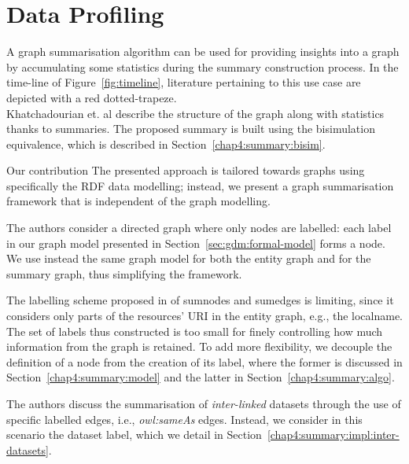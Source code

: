 
\section{Data Profiling}
\label{chap3:review:query-profiling}

A graph summarisation algorithm can be used for providing insights into a graph by accumulating some statistics during the summary construction process. In the time-line of Figure~\ref{fig:timeline}, literature pertaining to this use case are depicted with a red dotted-trapeze.\\

Khatchadourian et. al \cite{khatchadourian:2010:eswc} describe the structure of the graph along with statistics thanks to summaries. The proposed summary is built using the bisimulation equivalence, which is described in Section~\ref{chap4:summary:bisim}.

\begin{centeremph}{Our contribution}
	The presented approach is tailored towards graphs using specifically the RDF data modelling; instead, we present a graph summarisation framework that is independent of the graph modelling.

	The authors consider a directed graph where only nodes are labelled: each label in our graph model presented in Section~\ref{sec:gdm:formal-model} forms a node. We use instead the same graph model for both the entity graph and for the summary graph, thus simplifying the framework.

	The labelling scheme proposed in \cite{khatchadourian:2010:eswc} of sumnodes and sumedges is limiting, since it considers only parts of the resources' URI in the entity graph, e.g., the localname. The set of labels thus constructed is too small for finely controlling how much information from the graph is retained. To add more flexibility, we decouple the definition of a node from the creation of its label, where the former is discussed in Section~\ref{chap4:summary:model} and the latter in Section~\ref{chap4:summary:algo}.

	The authors discuss the summarisation of \emph{inter-linked} datasets through the use of specific labelled edges, i.e., \emph{owl:sameAs} edges. Instead, we consider in this scenario the dataset label, which we detail in Section~\ref{chap4:summary:impl:inter-datasets}.
\end{centeremph}

